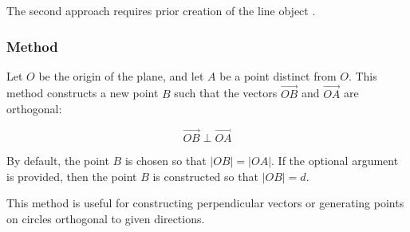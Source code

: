 The second approach requires prior creation of the line object .

\vspace{1em}

\begin{tkzexample}[latex=8cm]
\end{tkzexample}

\subsubsection{Method }
\label{ssub:orthogonal_method}

Let $O$ be the origin of the plane, and let $A$ be a point distinct from $O$. This method constructs a new point $B$ such that the vectors $\overrightarrow{OB}$ and $\overrightarrow{OA}$ are orthogonal:

\[
\overrightarrow{OB} \perp \overrightarrow{OA}
\]

\medskip
\DeleteShortVerb{\|}
By default, the point $B$ is chosen so that $|OB| = |OA|$. If the optional argument  is provided, then the point $B$ is constructed so that $|OB| = d$.
\MakeShortVerb{\|}

\medskip

This method is useful for constructing perpendicular vectors or generating points on circles orthogonal to given directions.

\vspace{1em}


\begin{tkzexample}[latex=7cm]
\begin{center}
\end{center}
\end{tkzexample}

